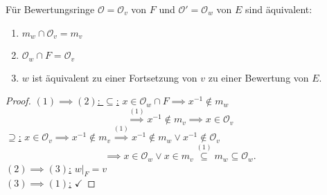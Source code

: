 \begin{lemma}
    Für Bewertungsringe $\mathcal{O}=\mathcal{O}_v$ von $F$ und $\mathcal{O}' = \mathcal{O}_w$ von $E$ sind äquivalent:
    \begin{enumerate}[label=(\arabic*)]
        \item $m_w \cap \mathcal{O}_v = m_v$
        \item $\mathcal{O}_w \cap F = \mathcal{O}_v$
        \item $w$ ist äquivalent zu einer Fortsetzung von $v$ zu einer Bewertung von $E$.
    \end{enumerate}
\end{lemma}
\begin{proof}
    \underline{$(1) \implies (2)$: $\subseteq$:} $x \in \mathcal{O}_w \cap F \implies x^{-1} \notin m_w$
    $$ \stackrel{(1)}{\implies} x^{-1} \notin m_v \implies x \in \mathcal{O}_v$$
    \underline{$\supseteq$:} $x \in \mathcal{O}_v \implies x^{-1} \notin m_v \stackrel{(1)}{\implies} x^{-1} \notin m_w \lor x^{-1} \notin \mathcal{O}_v$
    $$ \implies x \in \mathcal{O}_w \lor x \in m_v \stackrel{(1)}{\subseteq} m_w \subseteq \mathcal{O}_w.$$ 
    \underline{$(2) \implies (3)$:} $ w|_F = v$\\
    \underline{$(3) \implies (1)$:} $\checkmark$
\end{proof}

